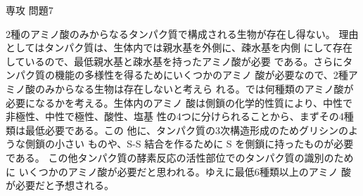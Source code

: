 \documentclass[fleqn]{jbook}
\begin{document}
\begin{answer}{専攻 問題7}{}
\begin{subanswers}
\begin{subsubanswers}
  \SubSubAnswer
    2種のアミノ酸のみからなるタンパク質で構成される生物が存在し得ない。
    理由としてはタンパク質は、生体内では親水基を外側に、疎水基を内側
    にして存在しているので、最低親水基と疎水基を持ったアミノ酸が必要
    である。さらにタンパク質の機能の多様性を得るためにいくつかのアミノ
    酸が必要なので、2種アミノ酸のみからなる生物は存在しないと考えら
    れる。では何種類のアミノ酸が必要になるかを考える。生体内のアミノ
    酸は側鎖の化学的性質により、中性で非極性、中性で極性、酸性、塩基
    性の4つに分けられることから、まずその4種類は最低必要である。この
    他に、タンパク質の3次構造形成のためグリシンのような側鎖の小さい
    ものや、S-S 結合を作るために S を側鎖に持ったものが必要である。
    この他タンパク質の酵素反応の活性部位でのタンパク質の識別のために
    いくつかのアミノ酸が必要だと思われる。ゆえに最低6種類以上のアミノ
    酸が必要だと予想される。

  \end{subsubanswers}
\end{subanswers}
\end{answer}
\end{document}
